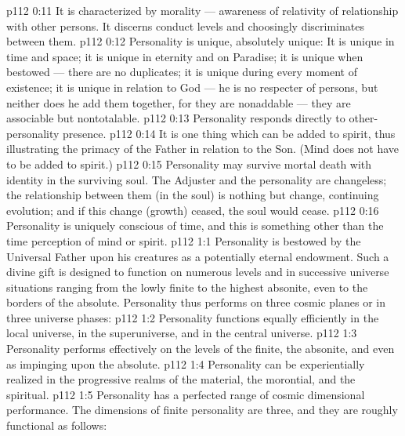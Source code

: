 \vs p112 0:11 \bibnobreakspace It is characterized by morality --- awareness of relativity of relationship with other persons. It discerns conduct levels and choosingly discriminates between them.
\vs p112 0:12 \bibnobreakspace Personality is unique, absolutely unique: It is unique in time and space; it is unique in eternity and on Paradise; it is unique when bestowed --- there are no duplicates; it is unique during every moment of existence; it is unique in relation to God --- he is no respecter of persons, but neither does he add them together, for they are nonaddable --- they are associable but nontotalable.
\vs p112 0:13 \bibnobreakspace Personality responds directly to other\hyp{}personality presence.
\vs p112 0:14 \bibnobreakspace It is one thing which can be added to spirit, thus illustrating the primacy of the Father in relation to the Son. (Mind does not have to be added to spirit.)
\vs p112 0:15 \bibnobreakspace Personality may survive mortal death with identity in the surviving soul. The Adjuster and the personality are changeless; the relationship between them (in the soul) is nothing but change, continuing evolution; and if this change (growth) ceased, the soul would cease.
\vs p112 0:16 \bibnobreakspace Personality is uniquely conscious of time, and this is something other than the time perception of mind or spirit.
\vs p112 1:1 Personality is bestowed by the Universal Father upon his creatures as a potentially eternal endowment. Such a divine gift is designed to function on numerous levels and in successive universe situations ranging from the lowly finite to the highest absonite, even to the borders of the absolute. Personality thus performs on three cosmic planes or in three universe phases:
\vs p112 1:2 \bibnobreakspace {} Personality functions equally efficiently in the local universe, in the superuniverse, and in the central universe.
\vs p112 1:3 \bibnobreakspace {} Personality performs effectively on the levels of the finite, the absonite, and even as impinging upon the absolute.
\vs p112 1:4 \bibnobreakspace {} Personality can be experientially realized in the progressive realms of the material, the morontial, and the spiritual.
\vs p112 1:5 \pc Personality has a perfected range of cosmic dimensional performance. The dimensions of finite personality are three, and they are roughly functional as follows:
